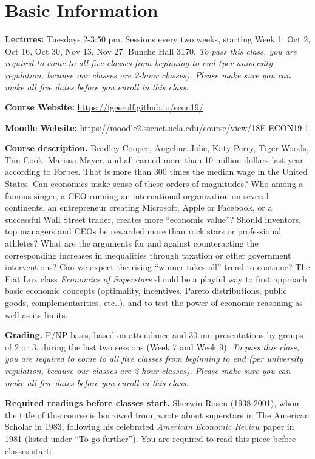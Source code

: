 \documentclass[]{book}
\theoremstyle{definition}
\theoremstyle{definition}
\theoremstyle{definition}
\theoremstyle{remark}
\begin{document}
\section{Basic Information}\label{basic-information}

\textbf{Lectures:} Tuesdays 2-3:50 pm. Sessions every two weeks,
starting Week 1: Oct 2, Oct 16, Oct 30, Nov 13, Nov 27. Bunche Hall
3170. \emph{To pass this class, you are required to come to all five
classes from beginning to end (per university regulation, because our
classes are 2-hour classes). Please make sure you can make all five
dates before you enroll in this class.}

\textbf{Course Website:} \url{https://fgeerolf.github.io/econ19/}

\textbf{Moodle Website:}
\url{https://moodle2.sscnet.ucla.edu/course/view/18F-ECON19-1}

\textbf{Course description.} Bradley Cooper, Angelina Jolie, Katy Perry,
Tiger Woods, Tim Cook, Marissa Mayer, and all earned more than 10
million dollars last year according to Forbes. That is more than 300
times the median wage in the United States. Can economics make sense of
these orders of magnitudes? Who among a famous singer, a CEO running an
international organization on several continents, an entrepreneur
creating Microsoft, Apple or Facebook, or a successful Wall Street
trader, creates more ``economic value''? Should inventors, top managers
and CEOs be rewarded more than rock stars or professional athletes? What
are the arguments for and against counteracting the corresponding
increases in inequalities through taxation or other government
interventions? Can we expect the rising ``winner-takes-all'' trend to
continue? The Fiat Lux class \emph{Economics of Superstars} should be a
playful way to first approach basic economic concepts (optimality,
incentives, Pareto distributions, public goods, complementarities,
etc..), and to test the power of economic reasoning as well as its
limits.

\textbf{Grading.} P/NP basis, based on attendance and 30 mn
presentations by groups of 2 or 3, during the last two sessions (Week 7
and Week 9). \emph{To pass this class, you are required to come to all
five classes from beginning to end (per university regulation, because
our classes are 2-hour classes). Please make sure you can make all five
dates before you enroll in this class.}

\textbf{Required readings before classes start.} Sherwin Rosen
(1938-2001), whom the title of this course is borrowed from, wrote about
superstars in The American Scholar in 1983, following his celebrated
\emph{American Economic Review} paper in 1981 (listed under ``To go
further''). You are required to read this piece before classes start:
\end{document}
